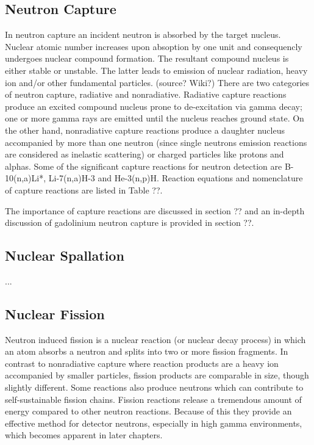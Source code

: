 \subsection{Neutron Capture}
In neutron capture an incident neutron is absorbed by the target nucleus. Nuclear atomic number increases upon absoption by one unit and consequencly undergoes nuclear compound formation. The resultant compound nucleus is either stable or unstable. The latter leads to emission of nuclear radiation, heavy ion and/or other fundamental particles. (source? Wiki?)
There are two categories of neutron capture, radiative and nonradiative. Radiative capture reactions produce an excited compound nucleus prone to de-excitation via gamma decay; one or more gamma rays are emitted until the nucleus reaches ground state.
On the other hand, nonradiative capture reactions produce a daughter nucleus accompanied by more than one neutron (since single neutrons emission reactions are considered as inelastic scattering) or charged particles like protons and alphas.
Some of the significant capture reactions for neutron detection are B-10(n,a)Li*, Li-7(n,a)H-3 and He-3(n,p)H.
Reaction equations and nomenclature of capture reactions are listed in Table ??.

The importance of capture reactions are discussed in section ?? and an in-depth discussion of gadolinium neutron capture is provided in section ??.

\subsection{Nuclear Spallation}
...
\subsection{Nuclear Fission}
Neutron induced fission is a nuclear reaction (or nuclear decay process) in which an atom absorbs a neutron and splits into two or more fission fragments. In contrast to nonradiative capture where reaction products are a heavy ion accompanied by smaller particles, fission products are comparable in size, though slightly different. Some reactions also produce neutrons which can contribute to self-sustainable fission chains.
Fission reactions release a tremendous amount of energy compared to other neutron reactions. Because of this they provide an effective method for detector neutrons, especially in high gamma environments, which becomes apparent in later chapters.
